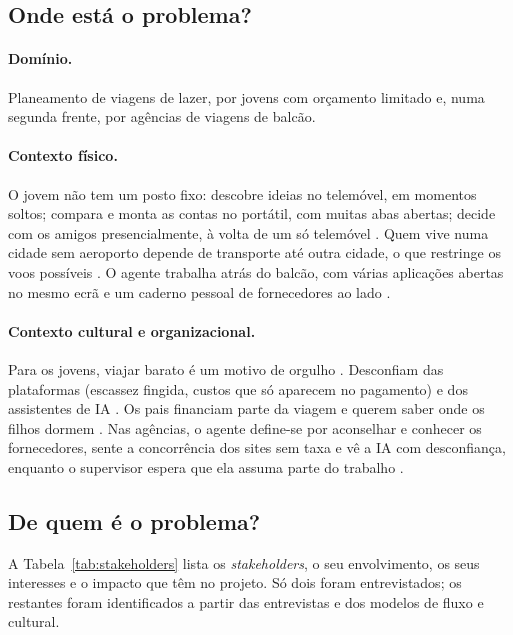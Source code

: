 \subsection{Onde está o problema?}

\paragraph{Domínio.} Planeamento de viagens de lazer, por jovens com orçamento limitado e, numa segunda frente, por 
agências de viagens de balcão.

\paragraph{Contexto físico.} O jovem não tem um posto fixo: descobre ideias no telemóvel, em momentos soltos; compara e 
monta as contas no portátil, com muitas abas abertas; decide com os amigos presencialmente, à volta de um só 
telemóvel . Quem vive numa cidade sem aeroporto depende de transporte até outra cidade, o que restringe os 
voos possíveis . O agente trabalha atrás do balcão, com várias aplicações abertas no mesmo ecrã e um caderno pessoal de 
fornecedores ao lado .

\paragraph{Contexto cultural e organizacional.} Para os jovens, viajar barato é um motivo de orgulho . 
Desconfiam das plataformas (escassez fingida, custos que só aparecem no pagamento) e dos assistentes de IA . 
Os pais financiam parte da viagem e querem saber onde os filhos dormem . Nas agências, o agente define-se por aconselhar 
e conhecer os fornecedores, sente a concorrência dos sites sem taxa e vê a IA com desconfiança, enquanto o supervisor espera que 
ela assuma parte do trabalho .

\subsection{De quem é o problema?}

A Tabela~\ref{tab:stakeholders} lista os \textit{stakeholders}, o seu envolvimento, os seus interesses 
e o impacto que têm no projeto. Só dois foram entrevistados; os restantes foram identificados a partir das entrevistas 
e dos modelos de fluxo e cultural.

